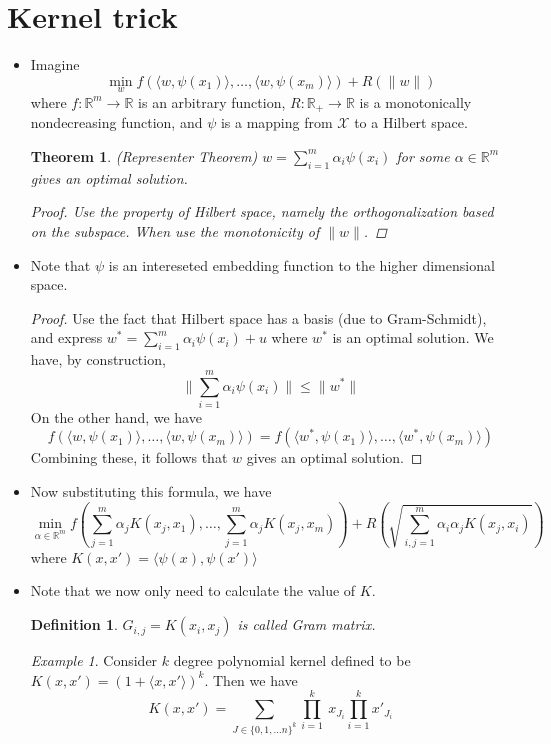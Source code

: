 \documentclass[11pt,reqno]{amsart}
\newtheorem{theorem}{Theorem}
\newtheorem{definition}{Definition}
\theoremstyle{remark}
\newtheorem{example}{Example}
\begin{document}
\begin{sloppypar}
\section{Kernel trick}
\begin{itemize}
\item Imagine
\[
\min\limits_w f(\langle w,\psi(x_1)\rangle,\dots,\langle w,\psi(x_m)\rangle)+R(\lVert w\rVert)
\]
where $f:\mathbb{R}^m\to \mathbb{R}$ is an arbitrary function, $R:\mathbb{R}_+\to\mathbb{R}$ is a monotonically nondecreasing function, and 
$\psi$ is a mapping from $\mathcal{X}$ to a Hilbert space.
\begin{theorem}(Representer Theorem)
$w=\sum^m_{i=1}\alpha_i\psi(x_i)$ for some $\alpha\in\mathbb{R}^m$ gives an optimal solution.
\begin{proof}
Use the property of Hilbert space, namely the orthogonalization based on the subspace. When use the monotonicity of $\lVert w\rVert$.
\end{proof}
\end{theorem}
\item Note that $\psi$ is an intereseted embedding function to the higher dimensional space.
\begin{proof} 
Use the fact that Hilbert space has a basis (due to Gram-Schmidt), and express $w^*=\sum\limits^m_{i=1}\alpha_i\psi(x_i)+u$ where $w^*$ is an optimal solution. 
We have, by construction, 
\[
\lVert\sum\limits^m_{i=1}\alpha_i\psi(x_i)\rVert\leq \lVert w^*\rVert
\]
On the other hand, we have 
\[
f(\langle w,\psi(x_1)\rangle,\dots,\langle w,\psi(x_m)\rangle)=f(\langle w^*,\psi(x_1)\rangle,\dots,\langle w^*,\psi(x_m)\rangle)
\]
Combining these, it follows that $w$ gives an optimal solution.
\end{proof}
\item Now substituting this formula, we have 
\[
\min\limits_{\alpha\in\mathbb{R}^m}f(\sum\limits^m_{j=1}\alpha_jK(x_j,x_1),\dots,\sum\limits^m_
{j=1}\alpha_jK(x_j,x_m))+R(\sqrt{\sum\limits^m_{i,j=1}\alpha_i\alpha_jK(x_j,x_i)})
\]
where $K(x,x')=\langle \psi(x),\psi(x')\rangle$
\item Note that we now only need to calculate the value of $K$.
\begin{definition}
$G_{i,j}=K(x_i,x_j)$ is called Gram matrix.
\end{definition}
\begin{example}
Consider $k$ degree polynomial kernel defined to be $K(x,x')=(1+\langle x,x'\rangle)^k$. Then we have
\[
K(x,x')=\sum\limits_{J\in\{0,1,\dots n\}^k} \prod\limits^k_{i=1}\ x_{J_i}\prod\limits^k_{i=1}x'_{J_i}
\]
\end{example}
\end{itemize}
\end{sloppypar}
\end{document}
